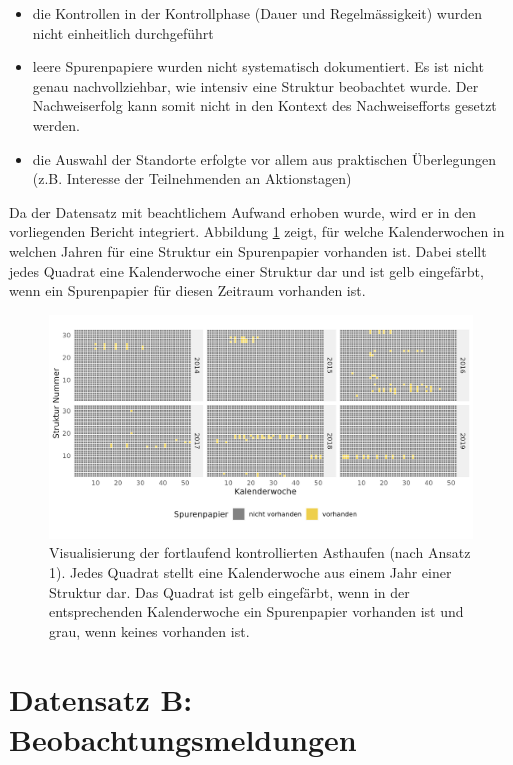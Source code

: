 \documentclass[
  oneside]{scrbook}
\providecommand{\tightlist}{%
  \setlength{\itemsep}{0pt}\setlength{\parskip}{0pt}}
\begin{document}
\begin{itemize}
\tightlist
\item
  die Kontrollen in der Kontrollphase (Dauer und Regelmässigkeit) wurden nicht einheitlich durchgeführt
\item
  leere Spurenpapiere wurden nicht systematisch dokumentiert. Es ist nicht genau nachvollziehbar, wie intensiv eine Struktur beobachtet wurde. Der Nachweiserfolg kann somit nicht in den Kontext des Nachweisefforts gesetzt werden.
\item
  die Auswahl der Standorte erfolgte vor allem aus praktischen Überlegungen (z.B. Interesse der Teilnehmenden an Aktionstagen)
\end{itemize}

Da der Datensatz mit beachtlichem Aufwand erhoben wurde, wird er in den vorliegenden Bericht integriert. Abbildung \ref{fig:wirkungskontrollespontaneffort} zeigt, für welche Kalenderwochen in welchen Jahren für eine Struktur ein Spurenpapier vorhanden ist. Dabei stellt jedes Quadrat eine Kalenderwoche einer Struktur dar und ist gelb eingefärbt, wenn ein Spurenpapier für diesen Zeitraum vorhanden ist.



\begin{figure}
\includegraphics[width=1\linewidth]{images/wirkungskontrolle_spontan_effort} \caption{Visualisierung der fortlaufend kontrollierten Asthaufen (nach Ansatz 1). Jedes Quadrat stellt eine Kalenderwoche aus einem Jahr einer Struktur dar. Das Quadrat ist gelb eingefärbt, wenn in der entsprechenden Kalenderwoche ein Spurenpapier vorhanden ist und grau, wenn keines vorhanden ist.}\label{fig:wirkungskontrollespontaneffort}
\end{figure}

\hypertarget{methode-datensatz-b}{%
\section{Datensatz B: Beobachtungsmeldungen}\label{methode-datensatz-b}}
\end{document}
